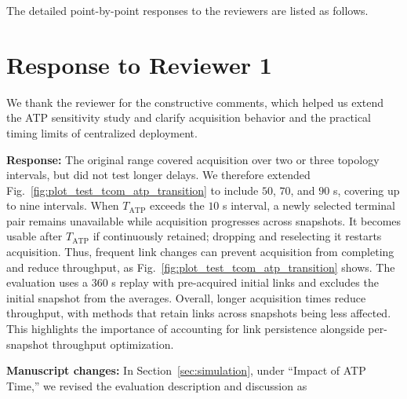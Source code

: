 \documentclass[journal,12pt,onecolumn,draftclsnofoot,]{IEEEtran}
\begin{document}
The detailed point-by-point responses to the reviewers are listed as follows.

\section*{\centering\Large\textbf{Response to Reviewer 1}}

We thank the reviewer for the constructive comments, which helped us extend the ATP sensitivity study and clarify acquisition behavior and the practical timing limits of centralized deployment.


\textbf{Response:} The original range covered acquisition over two or three topology intervals, but did not test longer delays. We therefore extended Fig.~\ref{fig:plot_test_tcom_atp_transition} to include $50$, $70$, and $90$ s, covering up to nine intervals. When $T_{\mathrm{ATP}}$ exceeds the $10$ s interval, a newly selected terminal pair remains unavailable while acquisition progresses across snapshots. It becomes usable after $T_{\mathrm{ATP}}$ if continuously retained; dropping and reselecting it restarts acquisition. Thus, frequent link changes can prevent acquisition from completing and reduce throughput, as Fig.~\ref{fig:plot_test_tcom_atp_transition} shows. The evaluation uses a $360$ s replay with pre-acquired initial links and excludes the initial snapshot from the averages.
Overall, longer acquisition times reduce throughput, with methods that retain links across snapshots being less affected. This highlights the importance of accounting for link persistence alongside per-snapshot throughput optimization.

\textbf{Manuscript changes:} In Section~\ref{sec:simulation}, under ``Impact of ATP Time,'' we revised the evaluation description and discussion as
\end{document}
